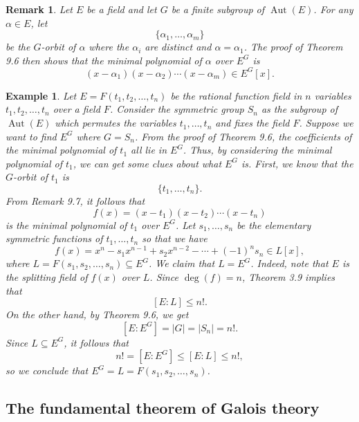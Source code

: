 \documentclass[10pt]{article}
\DeclareMathOperator{\Aut}{Aut}
\theoremstyle{newstyle}
\newtheorem{remark}[thm]{Remark}
\newtheorem{exmp}[thm]{Example}
\begin{document}
\begin{remark}
Let $E$ be a field and let $G$ be a finite subgroup of $\Aut(E)$. For any $\alpha \in E$, let 
\[ \{\alpha_1, \dots, \alpha_m\} \]
be the $G$-orbit of $\alpha$ where the $\alpha_i$ are distinct 
and $\alpha = \alpha_1$. The proof of Theorem 9.6 then shows that the 
minimal polynomial of $\alpha$ over $E^G$ is 
\[ (x-\alpha_1)(x- \alpha_2) \cdots (x - \alpha_m) \in E^G[x]. \]
\end{remark}

\begin{exmp}
Let $E = F(t_1, t_2, \dots, t_n)$ be the rational function field in $n$ variables 
$t_1, t_2, \dots, t_n$ over a field $F$. Consider the symmetric group $S_n$ as 
the subgroup of $\Aut(E)$ which permutes the variables $t_1, \dots, t_n$ and fixes the field $F$. 
Suppose we want to find $E^G$ where $G = S_n$. From the proof of Theorem 9.6, the coefficients 
of the minimal polynomial of $t_1$ all lie in $E^G$. Thus, by considering the minimal polynomial 
of $t_1$, we can get some clues about what $E^G$ is. First, we know that the $G$-orbit of $t_1$ is 
\[ \{t_1, \dots, t_n\}. \]
From Remark 9.7, it follows that 
\[ f(x) = (x-t_1)(x-t_2)\cdots (x-t_n) \]
is the minimal polynomial of $t_1$ over $E^G$. Let $s_1, \dots, s_n$ be the elementary symmetric
functions of $t_1, \dots, t_n$ so that we have 
\[ f(x) = x^n - s_1x^{n-1} + s_2x^{n-2} - \cdots + (-1)^n s_n \in L[x], \]
where $L = F(s_1, s_2, \dots, s_n) \subseteq E^G$. We claim that $L = E^G$. Indeed, 
note that $E$ is the splitting field of $f(x)$ over $L$. Since $\deg(f) = n$, Theorem 
3.9 implies that 
\[ [E : L] \leq n!. \]
On the other hand, by Theorem 9.6, we get 
\[ [E : E^G] = |G| = |S_n| = n!. \]
Since $L \subseteq E^G$, it follows that 
\[ n! = [E : E^G] \leq [E : L] \leq n!, \]
so we conclude that $E^G = L = F(s_1, s_2, \dots, s_n)$. 
\end{exmp}

\subsection{The fundamental theorem of Galois theory}
\end{document}
